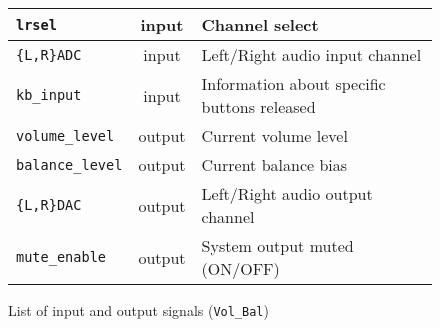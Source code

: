 \begin{figure}[h]
  \centering
  \caption{List of input and output signals (\texttt{Vol\_Bal})}
  \begin{tabular}{|l|c|l|}
    \hline
    \verb+lrsel+ & input & Channel select \\    \hline
    \verb+{L,R}ADC+ & input & Left/Right audio input channel \\    \hline
    \verb+kb_input+ & input & Information about specific buttons released \\    \hline
%
    \verb+volume_level+ & output & Current volume level \\    \hline
    \verb+balance_level+ & output & Current balance bias \\    \hline
    \verb+{L,R}DAC+ & output & Left/Right audio output channel \\    \hline
    \verb+mute_enable+ & output & System output muted (ON/OFF) \\    \hline
  \end{tabular}
\end{figure}